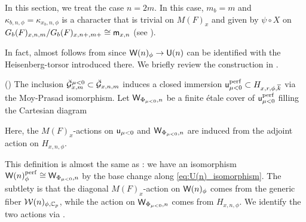 \documentclass[12pt,reqno]{amsart}
\begin{document}
In this section, we treat the case $n = 2m$. In this case, $m_b = m$ and $\kappa_{b, n, \phi} = \kappa_{x_b, n, \phi}$ is a character that is trivial on $M(F)_x$ and given by $\psi \circ X$ on $G_b(F)_{x, n, m} / G_b(F)_{x, n+, m+} \cong {\mathsf{m}}_{x, n}$ (see \cite[Theorem 3]{Tak26_Yu}). 

In fact,  almost follows from \cite[Theorem 6]{Tak26_Yu} since ${\mathsf{W}}(n)_\phi \to {\mathsf{U}}(n)$ can be identified with the Heisenberg-torsor introduced there. We briefly review the construction in \cite{Tak26_Yu}. 

\begin{defi}\textup{(\cite[Definition 5.2]{Tak26_Yu})}
    The inclusion $\breve{{\mathcal{G}}}_{x, m}^{\mu < 0} \subset {\mathcal{\breve{G}}}_{x, n, m}$ induces a closed immersion ${\mathsf{u}}_{\mu < 0}^{\operatorname{perf}} \subset H_{x, r, \phi, {\overline{k}}}$ via the Moy-Prasad isomorphism. Let ${\mathsf{W}}_{\Phi_{\mu < 0}, n}$ be a finite \'{e}tale cover of ${\mathsf{u}}_{\mu < 0}^{\operatorname{perf}}$ filling the Cartesian diagram
    \begin{center}
    \end{center}
    Here, the $M(F)_x$-actions on ${\mathsf{u}}_{\mu < 0}$ and ${\mathsf{W}}_{\Phi_{\mu < 0}, n}$ are induced from the adjoint action on $H_{x, n, \phi}$. 
\end{defi}

This definition is almost the same as : we have an isomorphism ${\mathsf{W}}(n)_\phi^{\operatorname{perf}} \cong {\mathsf{W}}_{\Phi_{\mu < 0}, n}$ by the base change along \eqref{eq:U(n)_isomorphism}. The subtlety is that the diagonal $M(F)_x$-action on ${\mathsf{W}}(n)_\phi$ comes from the generic fiber ${\mathcal{W}}(n)_{\phi, \mathbb{C}_p}$, while the action on ${\mathsf{W}}_{\Phi_{\mu < 0}, n}$ comes from $H_{x, n, \phi}$. We identify the two actions via .
\end{document}
